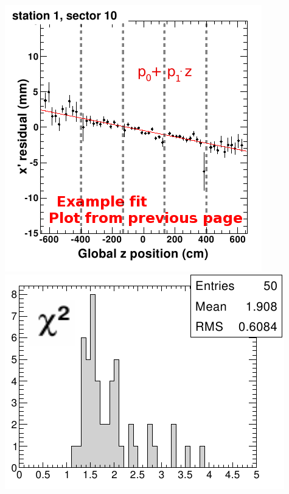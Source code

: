 \documentclass[compress]{beamer}
\begin{document}
\begin{frame}
\begin{columns}
\begin{columns}
\includegraphics[width=\linewidth]{growth_with_station2.png}
\includegraphics[width=\linewidth]{growth_with_station_chi2.png}
\end{columns}


\end{columns}
\end{frame}
\end{document}
